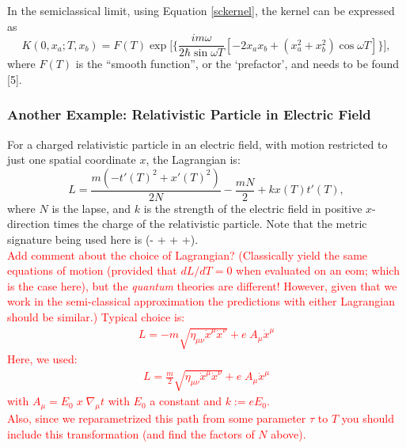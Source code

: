 \documentclass[12pt]{revtex4}
\newcommand{\red}{\textcolor{red}}
\begin{document}
In the semiclassical limit, using Equation \ref{sckernel}, the kernel can be expressed as 
\[ K(0,x_a;T,x_b)=F(T) \exp \Bigg[{\Bigg\{\frac{im\omega}{2 \hbar \sin\omega T} [-2 x_a x_b + (x_a^2 + x_b^2) \cos \omega T]\Bigg\}}\Bigg],\]
where $F(T)$ is the ``smooth function'', or the `prefactor', and needs to be found [5]. 

\subsubsection{Another Example: Relativistic Particle in Electric Field}
For a charged relativistic particle in an electric field, with motion restricted to just one spatial coordinate $x$, the Lagrangian is:
\[ L = \frac{m (-t'(T)^2 + x'(T)^2)}{2N} -\frac{m N}{2} + k x(T) t'(T),\]
where $N$ is the lapse, and $k$ is the strength of the electric field in positive $x$-direction times the charge of the relativistic particle. Note that the metric signature being used here is (- + + +).
\red{\\
Add comment about the choice of Lagrangian? (Classically yield the same equations of motion (provided that $dL/dT =0$ when evaluated on an eom; which is the case here), but the \textit{quantum} theories are different! 
However, given that we work in the semi-classical approximation the predictions with either Lagrangian should be similar.)
Typical choice is:
\begin{align}
 	L = - m \sqrt{\eta_{\mu \nu} \dot{x}^{\mu} \dot{x}^{\nu} } + e \; A_\mu \dot{x}^{\mu} 
\end{align}
Here, we used:
\begin{align}
L = \frac{m}{2} \sqrt{\eta_{\mu \nu} \dot{x}^{\mu} \dot{x}^{\nu} } + e \; A_\mu \dot{x}^{\mu} 
\end{align}
with $A_\mu = E_0 \; x \; \nabla_\mu t$ with $E_0$ a constant and $k := e E_0$.
\\
Also, since we reparametrized this path from some parameter $\tau$ to $T$ you should include this transformation (and find the factors of $N$ above).
}
\end{document}
